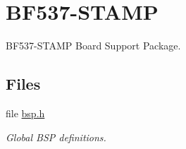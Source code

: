 \hypertarget{group__RTEMSBSPsBfinBF537Stamp}{}\section{B\+F537-\/\+S\+T\+A\+MP}
\label{group__RTEMSBSPsBfinBF537Stamp}


B\+F537-\/\+S\+T\+A\+MP Board Support Package.  


\subsection*{Files}
\begin{DoxyCompactItemize}
\item 
file \mbox{\hyperlink{bsps_2bfin_2bf537Stamp_2include_2bsp_8h}{bsp.\+h}}
\begin{DoxyCompactList}\small\item\em Global B\+SP definitions. \end{DoxyCompactList}\end{DoxyCompactItemize}
